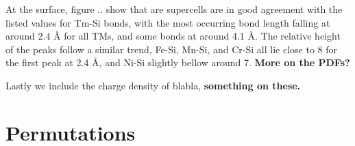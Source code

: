 At the surface, figure .. show that are supercells are in good agreement with the listed values for Tm-Si bonds, with the most occurring bond length falling at around 2.4 Å for all TMs, and some bonds at around 4.1 Å. The relative height of the peaks follow a similar trend, Fe-Si, Mn-Si, and Cr-Si all lie close to 8 for the first peak at 2.4 Å, and Ni-Si slightly bellow around 7. \textbf{More on the PDFs?}

Lastly we include the charge density of blabla, \textbf{something on these.}

\section{Permutations}